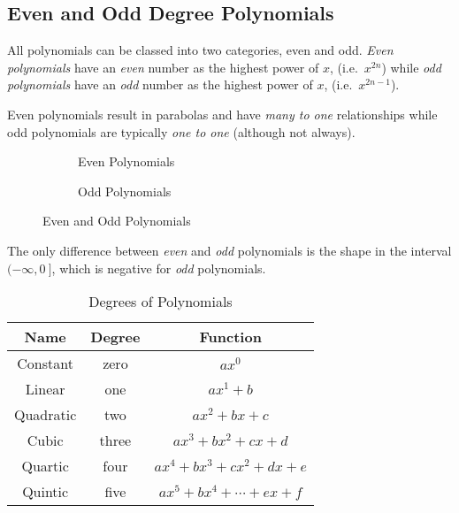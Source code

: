 \documentclass[a5paper,9pt]{book}
\theoremstyle{definition}
\begin{document}
        \pagebreak

        \subsection{Even and Odd Degree Polynomials}

        All polynomials can be classed into two categories, even and odd. \emph{Even polynomials}
        have an \emph{even} number as the highest power of $x$, (i.e.\ $x^{2n}$) while \emph{odd polynomials}
        have an \emph{odd} number as the highest power of $x$, (i.e.\ $x^{2n-1}$).

        Even polynomials result in parabolas and have \emph{many to one} relationships
        while odd polynomials are typically \emph{one to one} (although not always).

        \begin{figure}[ht]
            \centering
            \begin{subfigure}{.45\textwidth}
                \centering
                
                \caption{Even Polynomials}\label{fig:even_polynomials}
            \end{subfigure}
            \begin{subfigure}{.45\textwidth}
                \centering
                
                \caption{Odd Polynomials}\label{fig:odd_polynomials}
            \end{subfigure}
            \caption{Even and Odd Polynomials}\label{fig:even_odd_polynomials}
        \end{figure}

        The only difference between \emph{even} and \emph{odd} polynomials is the shape
        in the interval $(-\infty,0\:\!]$, which is negative for \emph{odd} polynomials.

        \begin{table}[ht]
            \centering
            \begin{threeparttable}
            \caption{Degrees of Polynomials}\label{tab:degrees_of_polynomials}
            \begin{tabular}{ccc}
                \toprule
                \textbf{Name} & \textbf{Degree} & \textbf{Function}  \\
                \midrule
                Constant & zero & $ax^0$ \\
                Linear & one & $ax^1+b$ \\
                Quadratic & two & $ax^2+bx+c$ \\
                Cubic & three & $ax^3+bx^2+cx+d$ \\
                Quartic & four & $ax^4+bx^3+cx^2+dx+e$ \\
                Quintic & five & $ax^5+bx^4+\cdots+ex+f$ \\
                \bottomrule
            \end{tabular}
            \end{threeparttable}
        \end{table}
\end{document}
